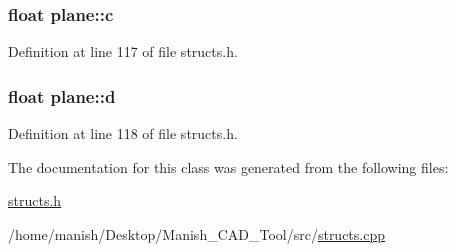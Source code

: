 \subsubsection[{\texorpdfstring{c}{c}}]{\setlength{\rightskip}{0pt plus 5cm}float plane\+::c}\hypertarget{classplane_a3024e149a5b2cb4697fa71ae7d539bd1}{}\label{classplane_a3024e149a5b2cb4697fa71ae7d539bd1}


Definition at line 117 of file structs.\+h.

\subsubsection[{\texorpdfstring{d}{d}}]{\setlength{\rightskip}{0pt plus 5cm}float plane\+::d}\hypertarget{classplane_a9a3cb65698785bad8199e7afbd083e27}{}\label{classplane_a9a3cb65698785bad8199e7afbd083e27}


Definition at line 118 of file structs.\+h.



The documentation for this class was generated from the following files\+:\begin{DoxyCompactItemize}
\item 
\hyperlink{structs_8h}{structs.\+h}\item 
/home/manish/\+Desktop/\+Manish\+\_\+\+C\+A\+D\+\_\+\+Tool/src/\hyperlink{structs_8cpp}{structs.\+cpp}\end{DoxyCompactItemize}
